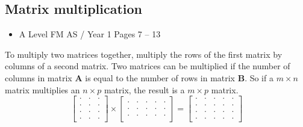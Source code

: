 \documentclass[11pt, a4paper]{article}
\begin{document}
\subsection{Matrix multiplication}
\begin{itemize}
\item A Level FM AS / Year 1 \hspace{1cm} Pages 7 -- 13
\end{itemize} \par
To multiply two matrices together, multiply the rows of the first matrix by columns of a second matrix. Two matrices can be multiplied if the number of columns in matrix $\boldsymbol{A}$ is equal to the number of rows in matrix $\boldsymbol{B}$. So if a $m\times n$ matrix multiplies an $n\times p$ matrix, the result is a $m\times p$ matrix.
\begin{equation*}
\begin{bmatrix}\cdot&\cdot&\cdot\\\cdot&\cdot&\cdot\\\cdot&\cdot&\cdot\\\cdot&\cdot&\cdot\end{bmatrix}\times\begin{bmatrix}\cdot&\cdot&\cdot&\cdot&\cdot\\\cdot&\cdot&\cdot&\cdot&\cdot\\\cdot&\cdot&\cdot&\cdot&\cdot\end{bmatrix}=\begin{bmatrix}\cdot&\cdot&\cdot&\cdot&\cdot\\\cdot&\cdot&\cdot&\cdot&\cdot\\\cdot&\cdot&\cdot&\cdot&\cdot\\\cdot&\cdot&\cdot&\cdot&\cdot\end{bmatrix}
\end{equation*}
\vspace{0.5cm}
\end{document}
